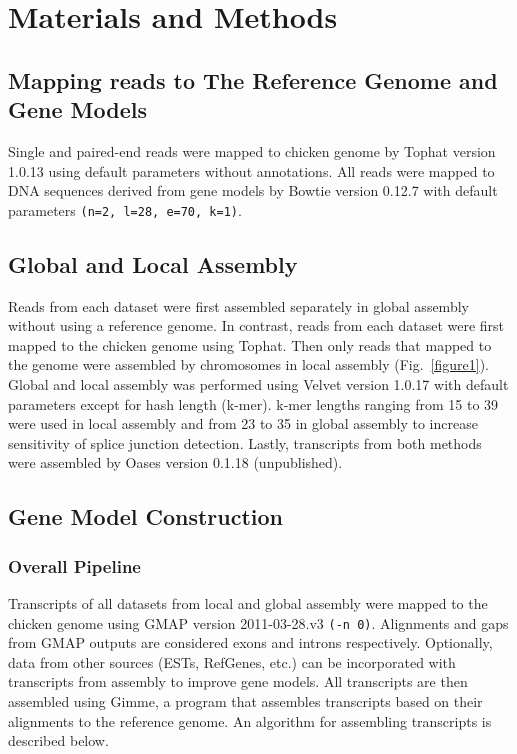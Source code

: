 \documentclass[10pt]{article}
\begin{document}
\section*{Materials and Methods}

\subsection*{Mapping reads to The Reference Genome and Gene Models}

Single and paired-end reads were mapped to chicken genome by Tophat\cite{Trapnell:2009dp} version 1.0.13 using default parameters without annotations.
All reads were mapped to DNA sequences derived from gene models by Bowtie version 0.12.7\cite{Langmead:2009fv} with default parameters \texttt{(n=2, l=28, e=70, k=1)}.

\subsection*{Global and Local Assembly}

Reads from each dataset were first assembled separately in global assembly without using a reference genome.
In contrast, reads from each dataset were first mapped to the chicken genome using Tophat.
Then only reads that mapped to the genome were assembled by chromosomes in local assembly (Fig.~\ref{figure1}).
Global and local assembly was performed using Velvet version 1.0.17\cite{Zerbino:2008vu} with default parameters except for hash length (k-mer).
k-mer lengths ranging from 15 to 39 were used in local assembly and from 23 to 35 in global assembly to increase sensitivity of splice junction detection.
Lastly, transcripts from both methods were assembled by Oases version 0.1.18 (unpublished).

\subsection*{Gene Model Construction}

\subsubsection*{Overall Pipeline}

Transcripts of all datasets from local and global assembly were mapped to the chicken genome using GMAP version 2011-03-28.v3\cite{Wu:2005bl} \texttt{(-n 0)}.
Alignments and gaps from GMAP outputs are considered exons and introns respectively.
Optionally, data from other sources (ESTs, RefGenes, etc.) can be incorporated with transcripts from assembly to improve gene models.
All transcripts are then assembled using Gimme, a program that assembles transcripts based on their alignments to the reference genome.
An algorithm for assembling transcripts is described below.
\end{document}
